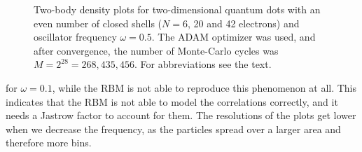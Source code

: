 \begin{figure}[H]
	\hspace{0.1cm}
	
	\caption{Two-body density plots for two-dimensional quantum dots with an even number of closed shells ($N=6$, 20 and 42 electrons) and oscillator frequency $\omega=0.5$. The ADAM optimizer was used, and after convergence, the number of Monte-Carlo cycles was $M=2^{28}=268,435,456$. For abbreviations see the text.}%
	\label{fig:TB_interaction_20P}
\end{figure}
\noindent
for $\omega=0.1$, while the RBM is not able to reproduce this phenomenon at all. This indicates that the RBM is not able to model the correlations correctly, and it needs a Jastrow factor to account for them. The resolutions of the plots get lower when we decrease the frequency, as the particles spread over a larger area and therefore more bins.

